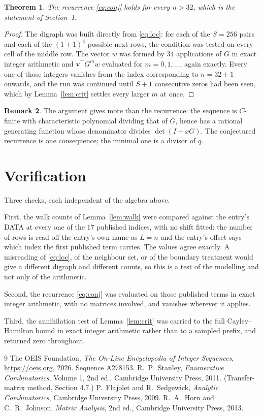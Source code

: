 \documentclass[11pt,a4paper]{article}
\theoremstyle{plain}
\newtheorem{theorem}{Theorem}
\theoremstyle{definition}
\newtheorem{remark}[theorem]{Remark}
\begin{document}
\begin{theorem}
The recurrence \eqref{eq:conj} holds for every $n>32$, which is the statement of
Section~1.
\end{theorem}

\begin{proof}
The digraph was built directly from \eqref{eq:loc}: for each of the $S=256$ pairs and each
of the $(1+1)^{4}$ possible next rows, the condition was tested on every cell of
the middle row. The vector $w$ was formed by $31$ applications of $G$ in exact integer
arithmetic and $\mathbf{v}^{\!\top}G^{m}w$ evaluated for $m=0,1,\dots$, again exactly.
Every one of those integers vanishes from the index corresponding to $n=32+1$ onwards,
and the run was continued until $S+1$ consecutive zeros had been seen, which by
Lemma~\ref{lem:crit} settles every larger $m$ at once.
\end{proof}

\begin{remark}
The argument gives more than the recurrence: the sequence is $C$-finite with characteristic
polynomial dividing that of $G$, hence has a rational generating function whose denominator
divides $\det(I-xG)$. The conjectured recurrence is one consequence; the minimal one is a
divisor of $q$.
\end{remark}

\section{Verification}

Three checks, each independent of the algebra above.

First, the walk counts of Lemma~\ref{lem:walk} were compared against the entry's DATA at
every one of the $17$ published indices, with no shift fitted: the number of rows is
read off the entry's own name as $L=n$ and the entry's offset says which index the first
published term carries. The values agree exactly. A misreading of \eqref{eq:loc}, of the
neighbour set, or of the boundary treatment would give a different digraph and different
counts, so this is a test of the modelling and not only of the arithmetic.

Second, the recurrence \eqref{eq:conj} was evaluated on those published terms in exact
integer arithmetic, with no matrices involved, and vanishes wherever it applies.

Third, the annihilation test of Lemma~\ref{lem:crit} was carried to the full
Cayley--Hamilton bound in exact integer arithmetic rather than to a sampled prefix, and
returned zero throughout.

\begin{thebibliography}{9}
 The OEIS Foundation, \emph{The On-Line Encyclopedia of Integer
Sequences}, \url{https://oeis.org}, 2026. Sequence A278153.
 R.~P.~Stanley, \emph{Enumerative Combinatorics}, Volume 1, 2nd ed.,
Cambridge University Press, 2011. (Transfer-matrix method, Section 4.7.)
 P.~Flajolet and R.~Sedgewick, \emph{Analytic Combinatorics}, Cambridge
University Press, 2009.
 R.~A.~Horn and C.~R.~Johnson, \emph{Matrix Analysis}, 2nd ed., Cambridge
University Press, 2013.
\end{thebibliography}
\end{document}
